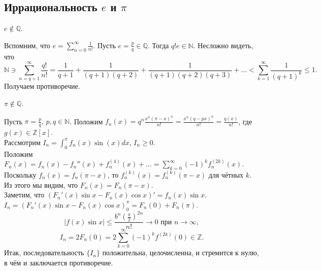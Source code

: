 \subsection{Иррациональность $e$ и $\pi$}
\begin{theorem} \label{l9_thm_e_irr}
	$e \not\in \mathbb{Q}$.
\end{theorem}
\begin{pf}
	Вспомним, что $\displaystyle e = \sum_{n=0}^{\infty} \frac{1}{n!}$. Пусть $e = \frac{p}{q} \in \mathbb{Q}$. Тогда $q! e \in \mathbb{N}$. Несложно видеть, что
	$$\mathbb{N} \ni \sum_{n = q + 1}^{\infty} \frac{q!}{n!} = \frac{1}{q + 1} + \frac{1}{(q + 1)(q+2)} + \frac{1}{(q+1)(q+2)(q+3)} + \ldots < \sum_{k = 1}^{\infty} \frac{1}{(q+1)^k} \leq 1.$$
	Получаем противоречие.
\end{pf}

\begin{theorem} \label{l9_thm_pi_irr}
	$\pi \not \in \mathbb{Q}$.
\end{theorem}
\begin{pf}
	Пусть $\pi = \frac{p}{q}, \, p,q \in \mathbb{N}$.
	Положим $\displaystyle f_n(x) = q^n \frac{x^n (\pi - x)^n}{n!} = \frac{x^n (q - px)^n}{n!} = \frac{q(x)}{n!}$, где $g(x) \in \mathbb{Z}[x]$.\\
	Рассмотрим $\displaystyle I_n = \int_{0}^{\pi} f_n(x) \sin(x) dx$, $I_n \geq 0$.\\
	Положим $\displaystyle F_n(x) = f_n(x) - f_n''(x) + f_n^{(4)}(x) + \ldots = \sum_{k = 0}^{\infty} (-1)^k f_n^{(2k)}(x)$.\\
	Поскольку $f_n(x) = f_n(\pi - x)$, то $f_n^{(k)}(x) = f_n^{(k)}(\pi - x)$ для чётных $k$. Из этого мы видим, что $F_n(x) = F_n(\pi - x)$.\\
	Заметим, что $\left( F_n'(x) \sin x - F_n(x) \cos x\right)' = f_n(x) \sin x$.\\
	$I_n = \left(F_n'(x) \sin x - F_n(x) \cos x \right)_{0}^{\pi} = F_n(0) + F_n(\pi)$.\\
	$$|f(x) \sin x| \leq \frac{b^n \left( \frac{\pi}{2}\right)^{2n}}{n!} \rightarrow 0 \text{ при } n \rightarrow \infty,$$
	$$I_n = 2F_n(0) = 2 \sum_{k=0}^{\infty} (-1)^kf^{(2k)}(0) \in \mathbb{Z}.$$
	Итак, последовательность $\lbrace I_n \rbrace$ положительна, целочисленна, и стремится к нулю, в чём и заключается противоречие.
\end{pf}